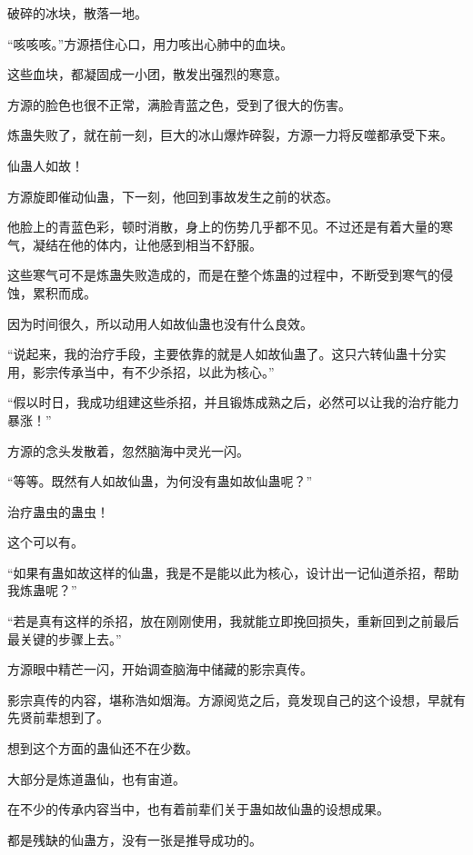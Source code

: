 
\begin{this_body}



破碎的冰块，散落一地。

“咳咳咳。”方源捂住心口，用力咳出心肺中的血块。

这些血块，都凝固成一小团，散发出强烈的寒意。

方源的脸色也很不正常，满脸青蓝之色，受到了很大的伤害。

炼蛊失败了，就在前一刻，巨大的冰山爆炸碎裂，方源一力将反噬都承受下来。

仙蛊人如故！

方源旋即催动仙蛊，下一刻，他回到事故发生之前的状态。

他脸上的青蓝色彩，顿时消散，身上的伤势几乎都不见。不过还是有着大量的寒气，凝结在他的体内，让他感到相当不舒服。

这些寒气可不是炼蛊失败造成的，而是在整个炼蛊的过程中，不断受到寒气的侵蚀，累积而成。

因为时间很久，所以动用人如故仙蛊也没有什么良效。

“说起来，我的治疗手段，主要依靠的就是人如故仙蛊了。这只六转仙蛊十分实用，影宗传承当中，有不少杀招，以此为核心。”

“假以时日，我成功组建这些杀招，并且锻炼成熟之后，必然可以让我的治疗能力暴涨！”

方源的念头发散着，忽然脑海中灵光一闪。

“等等。既然有人如故仙蛊，为何没有蛊如故仙蛊呢？”

治疗蛊虫的蛊虫！

这个可以有。

“如果有蛊如故这样的仙蛊，我是不是能以此为核心，设计出一记仙道杀招，帮助我炼蛊呢？”

“若是真有这样的杀招，放在刚刚使用，我就能立即挽回损失，重新回到之前最后最关键的步骤上去。”

方源眼中精芒一闪，开始调查脑海中储藏的影宗真传。

影宗真传的内容，堪称浩如烟海。方源阅览之后，竟发现自己的这个设想，早就有先贤前辈想到了。

想到这个方面的蛊仙还不在少数。

大部分是炼道蛊仙，也有宙道。

在不少的传承内容当中，也有着前辈们关于蛊如故仙蛊的设想成果。

都是残缺的仙蛊方，没有一张是推导成功的。


\end{this_body}
